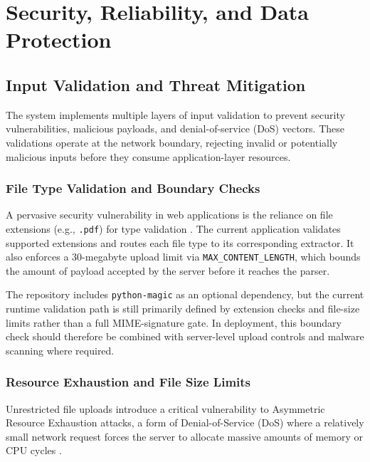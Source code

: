 \documentclass[12pt,a4paper,oneside]{report}
\begin{document}
\chapter{Security, Reliability, and Data Protection}

\section{Input Validation and Threat Mitigation}

The system implements multiple layers of input validation to prevent security vulnerabilities, malicious payloads, and denial-of-service (DoS) vectors. These validations operate at the network boundary, rejecting invalid or potentially malicious inputs before they consume application-layer resources.

\subsection{File Type Validation and Boundary Checks}

A pervasive security vulnerability in web applications is the reliance on file extensions (e.g., \texttt{.pdf}) for type validation \cite{owasp2025}. The current application validates supported extensions and routes each file type to its corresponding extractor. It also enforces a 30-megabyte upload limit via \texttt{MAX\_CONTENT\_LENGTH}, which bounds the amount of payload accepted by the server before it reaches the parser.

The repository includes \texttt{python-magic} as an optional dependency, but the current runtime validation path is still primarily defined by extension checks and file-size limits rather than a full MIME-signature gate. In deployment, this boundary check should therefore be combined with server-level upload controls and malware scanning where required.

\subsection{Resource Exhaustion and File Size Limits}

Unrestricted file uploads introduce a critical vulnerability to Asymmetric Resource Exhaustion attacks, a form of Denial-of-Service (DoS) where a relatively small network request forces the server to allocate massive amounts of memory or CPU cycles \cite{owasp2025}. 
\end{document}
